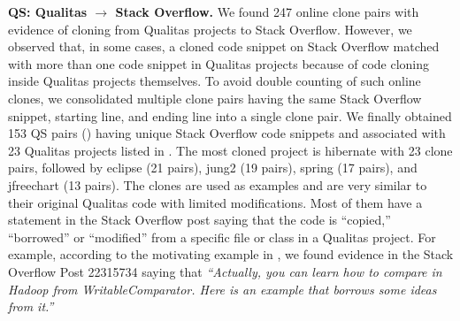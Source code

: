 \documentclass[10pt,journal,compsoc]{IEEEtran}
\begin{document}
\textbf{QS: Qualitas $\rightarrow$ Stack Overflow.} We found 247 online clone
pairs with evidence of cloning from Qualitas projects to Stack Overflow.
However, we observed that, in some cases, a cloned code snippet on Stack
Overflow matched with more than one code snippet in Qualitas projects because of
code cloning inside Qualitas projects themselves. To avoid double counting of
such online clones, we consolidated multiple clone pairs having the same Stack
Overflow snippet, starting line, and ending line into a single clone pair. We
finally obtained 153 QS pairs () having unique Stack Overflow code snippets and
associated with 23 Qualitas projects listed in .
The most cloned project is \textsf{hibernate} with 23
clone pairs, followed by \textsf{eclipse} (21 pairs), \textsf{jung2} (19 pairs),
\textsf{spring} (17 pairs), and \textsf{jfreechart} (13 pairs). The clones are
used as examples and are very similar to their original Qualitas code with
limited modifications. Most of them have a statement in the Stack Overflow post
saying that the code is ``copied,'' ``borrowed'' or ``modified'' from a specific
file or class in a Qualitas project. For example, according to the motivating
example in , we found evidence in the Stack Overflow Post
22315734 saying that \textit{``Actually, you can learn how to compare in Hadoop
from WritableComparator. Here is an example that borrows some ideas from it.''}
\end{document}

